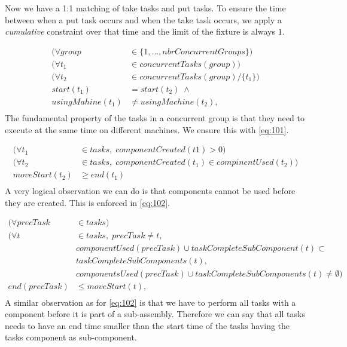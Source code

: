  Now we have a 1:1 matching of take tasks and put tasks. To ensure the time between when a put task occurs and when the take task occurs, we apply a \emph{cumulative} constraint over that time and the limit of the fixture is always $1$.
 
 \begin{equation}
 \begin{aligned}\label{eq:101}
 (\forall group &\in \{1 , \ldots , nbrConcurrentGroups\}) \\
 (\forall t_1 &\in concurrentTasks(group)) \\
 (\forall t_2 &\in concurrentTasks(group) / \{t_1\}) \\
 start(t_1) &= start(t_2) \; \land \\
 usingMahine(t_1) &\neq usingMachine(t_2), \\
 \end{aligned}
 \end{equation}
 The fundamental property of the tasks in a concurrent group is that they need to execute at the same time on different machines. We ensure this with \ref{eq:101}.
 
 \begin{equation}
 \begin{aligned}\label{eq:102}
 (\forall t_1 &\in tasks, \; componentCreated(t1) > 0) \\
 (\forall t_2 &\in tasks, \; componentCreated(t_1) \in compinentUsed(t_2)) \\
 moveStart(t_2) &\geq end(t_1) \\
 \end{aligned}
 \end{equation}
 A very logical observation we can do is that components cannot be used before they are created. This is enforced in \ref{eq:102}.
 
 \begin{equation}
 \begin{aligned}\label{eq:103}
 (\forall precTask &\in tasks) \\
 (\forall t &\in tasks, \; precTask \neq t,\\
 &componentUsed(precTask) \cup taskCompleteSubComponent(t) \subset\\
 &taskCompleteSubComponents(t),\\
 &componentsUsed(precTask) \cup taskCompleteSubComponents(t) \neq \emptyset)\\
 end(precTask) &\leq moveStart(t), \\
 \end{aligned}
 \end{equation}
 A similar observation as for \ref{eq:102} is that we have to perform all tasks with a component before it is part of a sub-assembly. Therefore we can say that all tasks needs to have an end time smaller than the start time of the tasks having the tasks component as sub-component.
 

